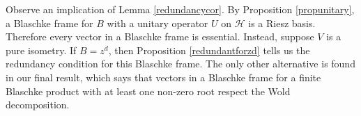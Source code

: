 \documentclass[10pt, reqno]{amsart}
\theoremstyle{definition}
\newtheorem{example}[theorem]{Example}
\numberwithin{equation}{section}
\begin{document}









Observe an implication of Lemma \ref{redundancycor}. By Proposition \ref{propunitary}, a Blaschke frame for $B$ with a unitary operator $U$ on $\mathcal{H}$ is a Riesz basis. Therefore every vector in a Blaschke frame is essential. Instead, suppose $V$ is a pure isometry. If $B=z^{d}$, then Proposition \ref{redundantforzd} tells us the redundancy condition for this Blaschke frame. The only other alternative is found in our final result, which says that vectors in a Blaschke frame for a finite Blaschke product with at least one non-zero root respect the Wold decomposition.
\end{document}
